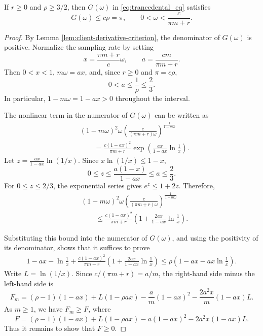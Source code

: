 \begin{lemma}
If $r\geq 0$ and $\rho\geq 3/2$, then $G\left(\omega\right)$ in \eqref{eq:trancedental_eq} satisfies
\[
G\left(\omega\right)\leq c\rho=\pi,\qquad 0<\omega<\frac{c}{\pi m+r}.
\]
\end{lemma}

\begin{proof}
By Lemma \ref{lem:client-derivative-criterion}, the denominator of $G\left(\omega\right)$ is positive. Normalize the sampling rate by setting
\[
x=\frac{\pi m+r}{c}\omega,\qquad
a=\frac{cm}{\pi m+r}.
\]
Then $0<x<1$, $m\omega=ax$, and, since $r\geq 0$ and $\pi=c\rho$,
\[
0<a\leq \frac{1}{\rho}\leq \frac{2}{3}.
\]
In particular, $1-m\omega=1-ax>0$ throughout the interval.

The nonlinear term in the numerator of $G\left(\omega\right)$ can be written as
\[
\begin{aligned}
&(1-m\omega)^2\omega
\left(\frac{c}{(\pi m+r)\omega}\right)^{\frac{1}{1-m\omega}}\\
&\qquad=
\frac{c(1-ax)^2}{\pi m+r}\exp\left(
\frac{ax}{1-ax}\ln\frac{1}{x}
\right).
\end{aligned}
\]
Let $z=\frac{ax}{1-ax}\ln(1/x)$. Since $x\ln(1/x)\leq 1-x$,
\[
0\leq z\leq \frac{a(1-x)}{1-ax}\leq a\leq \frac{2}{3}.
\]
For $0\leq z\leq 2/3$, the exponential series gives $e^z\leq 1+2z$. Therefore,
\[
\begin{aligned}
&(1-m\omega)^2\omega
\left(\frac{c}{(\pi m+r)\omega}\right)^{\frac{1}{1-m\omega}}\\
&\qquad\leq
\frac{c(1-ax)^2}{\pi m+r}
\left(1+\frac{2ax}{1-ax}\ln\frac{1}{x}\right).
\end{aligned}
\]

Substituting this bound into the numerator of $G\left(\omega\right)$, and using the positivity of its denominator, shows that it suffices to prove
\[
\begin{aligned}
1-ax-\ln\frac{1}{x}
+\frac{c(1-ax)^2}{\pi m+r}
\left(1+\frac{2ax}{1-ax}\ln\frac{1}{x}\right)
\leq
\rho\left(1-ax-ax\ln\frac{1}{x}\right).
\end{aligned}
\]
Write $L=\ln(1/x)$. Since $c/(\pi m+r)=a/m$, the right-hand side minus the left-hand side is
\[
F_m=(\rho-1)(1-ax)+L(1-\rho ax)
-\frac{a}{m}(1-ax)^2-\frac{2a^2x}{m}(1-ax)L.
\]
As $m\geq 1$, we have $F_m\geq F$, where
\[
F=(\rho-1)(1-ax)+L(1-\rho ax)
-a(1-ax)^2-2a^2x(1-ax)L.
\]
Thus it remains to show that $F\geq 0$.


\end{proof}

